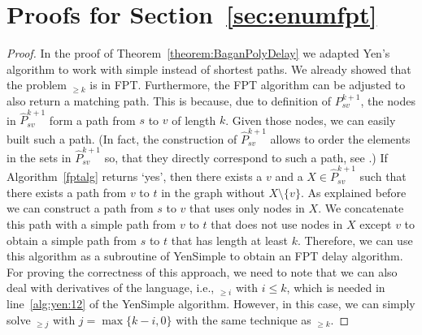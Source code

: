 \documentclass[a4paper,english]{lipics-v2016}
\theoremstyle{plain}
\begin{document}
\section{Proofs for Section~\ref{sec:enumfpt}}\label{app:enumfpt}

\fptdelayi*
\begin{proof}
  In the proof of Theorem~\ref{theorem:BaganPolyDelay} we adapted
  Yen's algorithm to work with simple instead of shortest paths. We
  already showed that the problem \nodesimpath$_{\geq k}$ is in
  FPT. Furthermore, the FPT algorithm can be adjusted to also return a
  matching path.  This is because, due to definition of
  $P^{k+1}_{sv}$, the nodes in $\hat{P}^{k+1}_{sv}$ form a path from
  $s$ to $v$ of length $k$. Given those nodes, we can easily built
  such a path.  (In fact, the construction of $\hat{P}^{k+1}_{sv}$
  allows to order the elements in the sets in $\hat{P}^{k+1}_{sv}$ so,
  that they directly correspond to such a path, see \cite[Lemma
  5.2]{fomin}.)  If Algorithm~\ref{fptalg} returns `yes', then there
  exists a $v$ and a $X \in \hat{P}^{k+1}_{sv}$ such that there exists
  a path from $v$ to $t$ in the graph without $X \setminus \{v\}$. As
  explained before we can construct a path from $s$ to $v$ that uses
  only nodes in $X$. We concatenate this path with a simple path from
  $v$ to $t$ that does not use nodes in $X$ except $v$ to obtain a
  simple path from $s$ to $t$ that has length at least $k$.
  Therefore, we can use this algorithm as a subroutine of YenSimple to
  obtain an FPT delay algorithm. For proving the correctness of this
  approach, we need to note that we can also deal with derivatives of
  the language, i.e., \nodesimpath$_{\geq i}$ with $i \leq k$, which is
  needed in line~\ref{alg:yen:12} of the YenSimple algorithm. However,
  in this case, we can simply solve     \nodesimpath$_{\geq j}$ with $j = \max\{k-i,0\}$
      with the
  same technique as \nodesimpath$_{\geq k}$.
\end{proof}
\end{document}
